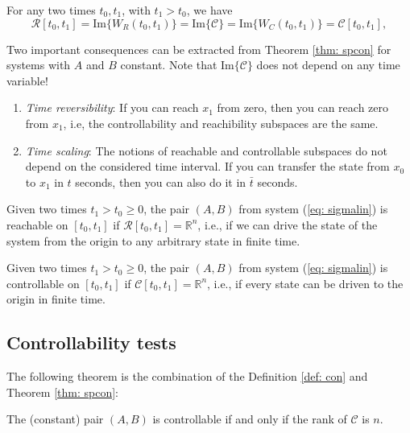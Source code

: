 \begin{theorem}
	\label{thm: spcon}
For any two times $t_0, t_1$, with $t_1 > t_0$, we have
	\begin{equation}
		\mathcal{R}[t_0,t_1] = \text{Im}\{W_R(t_0,t_1)\} = \text{Im}\{\mathcal{C}\} = \text{Im}\{W_C(t_0,t_1)\} = \mathcal{C}[t_0,t_1],
	\end{equation}
\end{theorem}

Two important consequences can be extracted from Theorem \ref{thm: spcon} for systems with $A$ and $B$ constant. Note that $\text{Im}\{\mathcal{C}\}$ does not depend on any time variable!
\begin{enumerate}
	\item \emph{Time reversibility}: If you can reach $x_1$ from zero, then you can reach zero from $x_1$, i.e, the controllability and reachibility subspaces are the same.
	\item \emph{Time scaling}: The notions of reachable and controllable subspaces do not depend on the considered time interval. If you can transfer the state from $x_0$ to $x_1$ in $t$ seconds, then you can also do it in $\bar t$ seconds.
\end{enumerate}

\begin{definition}
	Given two times $t_1 > t_0 \geq 0$, the pair $(A,B)$ from system (\ref{eq: sigmalin}) is reachable on $[t_0, t_1]$ if $\mathcal{R}[t_0,t_1] = \mathbb{R}^n$, i.e., if we can drive the state of the system from the origin to any arbitrary state in finite time.
\end{definition}

\begin{definition}
	\label{def: con}
	Given two times $t_1 > t_0 \geq 0$, the pair $(A,B)$ from system (\ref{eq: sigmalin}) is controllable on $[t_0, t_1]$ if $\mathcal{C}[t_0,t_1] = \mathbb{R}^n$, i.e., if every state can be driven to the origin in finite time.
\end{definition}

\subsection{Controllability tests}
The following theorem is the combination of the Definition \ref{def: con} and Theorem \ref{thm: spcon}:
\begin{theorem}
	The (constant) pair $(A,B)$ is controllable if and only if the rank of $\mathcal{C}$ is $n$.
\end{theorem}


